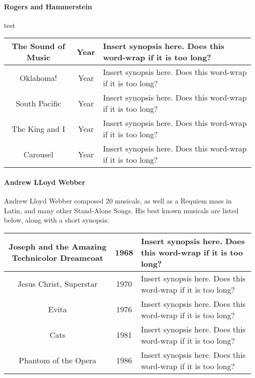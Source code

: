 		\paragraph{Rogers and Hammerstein} test

			\begin{longtable}{|c|c|p{3in}|}
				\hline
				The Sound of Music & Year & Insert synopsis here.  Does this word-wrap if it is too long?  \\
				\hline
				Oklahoma! & Year & Insert synopsis here.  Does this word-wrap if it is too long?  \\
				\hline
				South Pacific & Year & Insert synopsis here.  Does this word-wrap if it is too long? \\
				\hline
				The King and I & Year & Insert synopsis here.  Does this word-wrap if it is too long?  \\
				\hline
				Carousel & Year & Insert synopsis here.  Does this word-wrap if it is too long? \\
				\hline
			\end{longtable}


		\paragraph{Andrew LLoyd Webber}
			Andrew Lloyd Webber composed 20 musicals, as well as a Requiem mass in Latin, and many other Stand-Alone Songs.  His best known musicals are listed below, along with a short synopsis:
			
				\begin{longtable}{|c|c|p{3in}|}
					\hline
					Joseph and the Amazing Technicolor Dreamcoat & 1968 & Insert synopsis here.  Does this word-wrap if it is too long?  \\
					\hline
					Jesus Christ, Superstar & 1970 & Insert synopsis here.  Does this word-wrap if it is too long?  \\
					\hline
					Evita & 1976 & Insert synopsis here.  Does this word-wrap if it is too long? \\
					\hline
					Cats & 1981 & Insert synopsis here.  Does this word-wrap if it is too long?  \\
					\hline
					Phantom of the Opera & 1986 & Insert synopsis here.  Does this word-wrap if it is too long? \\
					\hline
					
				
					
					
				\end{longtable}


